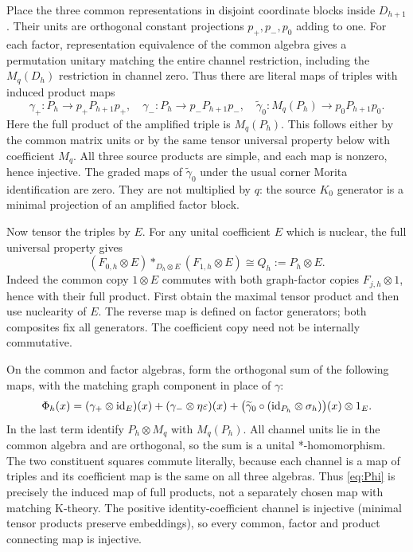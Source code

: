 \documentclass[11pt,letterpaper]{amsart}
\theoremstyle{remark}\newtheorem{remark}[theorem]{Remark}
\begin{document}
Place the three common representations in disjoint coordinate blocks
inside $D_{h+1}$. Their units are orthogonal constant projections
$p_+,p_-,p_0$ adding to one. For each factor, representation equivalence
of the common algebra gives a permutation unitary matching the entire
channel restriction, including the $M_q(D_h)$ restriction in channel
zero. Thus there are literal maps of triples with induced product maps
\[
 \gamma_+:P_h\to p_+P_{h+1}p_+,\quad
 \gamma_-:P_h\to p_-P_{h+1}p_-,\quad
 \widetilde\gamma_0:M_q(P_h)\to p_0P_{h+1}p_0.
\]
Here the full product of the amplified triple is $M_q(P_h)$.
This follows either by the common matrix units or by the same tensor
universal property below with coefficient $M_q$. All three source
products are simple, and each map is nonzero, hence injective.
The graded maps of $\widetilde\gamma_0$ under the usual corner Morita
identification are zero. They are not multiplied by $q$: the source
$K_0$ generator is a minimal projection of an amplified factor block.

Now tensor the triples by $E$. For any unital coefficient $E$ which is
nuclear, the full universal property gives
\begin{equation}\label{eq:tensor}
 (F_{0,h}\otimes E)*_{D_h\otimes E}(F_{1,h}\otimes E)
                  \cong Q_h:=P_h\otimes E.
\end{equation}
Indeed the common copy $1\otimes E$ commutes with both graph-factor
copies $F_{j,h}\otimes1$, hence with their full product. First obtain
the maximal tensor product and then use nuclearity of $E$. The reverse
map is defined on factor generators; both composites fix all generators.
The coefficient copy need not be internally commutative.

On the common and factor algebras, form the orthogonal sum of the
following maps, with the matching graph component in place of $\gamma$:
\begin{equation}\label{eq:Phi}
 \Phi_h(x)=
    (\gamma_+\otimes\mathrm{id}_E)(x)
   +(\gamma_-\otimes\eta\varepsilon)(x)
   +\bigl(\widetilde\gamma_0\circ(\mathrm{id}_{P_h}\otimes\sigma_h)\bigr)(x)
                                                        \otimes1_E.
\end{equation}
In the last term identify $P_h\otimes M_q$ with $M_q(P_h)$.
All channel units lie in the common algebra and are orthogonal, so the
sum is a unital *-homomorphism. The two constituent squares commute
literally, because each channel is a map of triples and its coefficient
map is the same on all three algebras. Thus \eqref{eq:Phi} is precisely
the induced map of full products, not a separately chosen map with
matching K-theory. The positive identity-coefficient channel is
injective (minimal tensor products preserve embeddings), so every
common, factor and product connecting map is injective.
\end{document}
